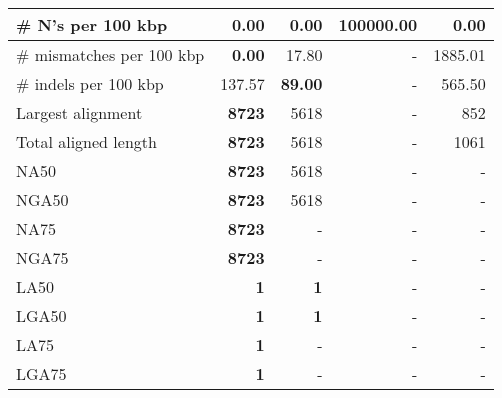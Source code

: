 \documentclass[12pt,a4paper]{article}
\begin{document}
\begin{table}[ht]
\begin{center}
\begin{tabular}{|l*{4}{|r}|}
\# N's per 100 kbp & {\bf 0.00} & {\bf 0.00} & 100000.00 & {\bf 0.00} \\ \hline
\# mismatches per 100 kbp & {\bf 0.00} & 17.80 & - & 1885.01 \\ \hline
\# indels per 100 kbp & 137.57 & {\bf 89.00} & - & 565.50 \\ \hline
Largest alignment & {\bf 8723} & 5618 & - & 852 \\ \hline
Total aligned length & {\bf 8723} & 5618 & - & 1061 \\ \hline
NA50 & {\bf 8723} & 5618 & - & - \\ \hline
NGA50 & {\bf 8723} & 5618 & - & - \\ \hline
NA75 & {\bf 8723} & - & - & - \\ \hline
NGA75 & {\bf 8723} & - & - & - \\ \hline
LA50 & {\bf 1} & {\bf 1} & - & - \\ \hline
LGA50 & {\bf 1} & {\bf 1} & - & - \\ \hline
LA75 & {\bf 1} & - & - & - \\ \hline
LGA75 & {\bf 1} & - & - & - \\ \hline
\end{tabular}
\end{center}
\end{table}
\end{document}
